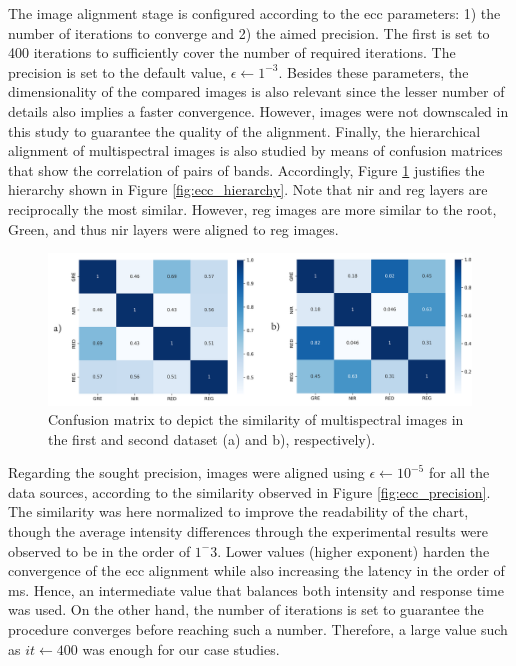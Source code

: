 The image alignment stage is configured according to the \acrshort{ecc} parameters: 1) the number of iterations to converge and 2) the aimed precision. The first is set to 400 iterations to sufficiently cover the number of required iterations. The precision is set to the default value, $\epsilon \gets 1^{-3}$. Besides these parameters, the dimensionality of the compared images is also relevant since the lesser number of details also implies a faster convergence. However, images were not downscaled in this study to guarantee the quality of the alignment. Finally, the hierarchical alignment of multispectral images is also studied by means of confusion matrices that show the correlation of pairs of bands. Accordingly, Figure \ref{fig:occlusion_confusion_matrices} justifies the hierarchy shown in Figure \ref{fig:ecc_hierarchy}. Note that \acrshort{nir} and \acrshort{reg} layers are reciprocally the most similar. However, \acrshort{reg} images are more similar to the root, Green, and thus \acrshort{nir} layers were aligned to \acrshort{reg} images.

\begin{figure}[ht]
    \centering
    \includegraphics[width=.9\linewidth]{figs/multi_thermal_projection/results/confusion_matrices.png}
    \caption{Confusion matrix to depict the similarity of multispectral images in the first and second dataset (a) and b), respectively).}
    \label{fig:occlusion_confusion_matrices}
\end{figure}

Regarding the sought precision, images were aligned using $\epsilon \gets 10^{-5}$ for all the data sources, according to the similarity observed in Figure \ref{fig:ecc_precision}. The similarity was here normalized to improve the readability of the chart, though the average intensity differences through the experimental results were observed to be in the order of $1^-3$. Lower values (higher exponent) harden the convergence of the \acrshort{ecc} alignment while also increasing the latency in the order of \si{\milli\second}. Hence, an intermediate value that balances both intensity and response time was used. On the other hand, the number of iterations is set to guarantee the procedure converges before reaching such a number. Therefore, a large value such as $\textit{it} \gets 400$ was enough for our case studies.


